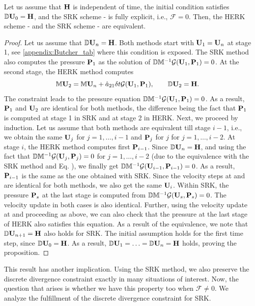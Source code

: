 \begin{proposition}\label{prop1}
Let us assume that $\H$ is independent of time, the initial condition satisfies $\D \U_0 = \H$, and the SRK scheme - is fully explicit, i.e., $\mathcal{F} = 0$. Then, the HERK scheme - and the SRK scheme  - are equivalent.
\end{proposition}
%
\begin{proof}
Let us assume that $\D \U_n = \H$. Both methods start with $\U_1 = \U_n$ at stage 1, see \ref{appendix:Butcher_tab} where this condition is exposed. The SRK method also computes the pressure $\P_1$ as the solution of $\D\M^{-1}\mathcal{G}(\U_1,\P_1) = 0$. At the second stage, the HERK method computes $$\M\U_2 = \M\U_n + \hat{a}_{21} \delta t \mathcal{G}(\U_1,\P_1), \qquad \D \U_2 = \H.$$ The constraint leads to the pressure equation $\D\M^{-1}\mathcal{G}(\U_1,\P_1) = 0$. As a result, $\P_1$ and $\U_2$ are identical for both methods, the difference being the fact that $\P_1$ is computed at stage 1 in SRK and at stage 2 in HERK. Next, we proceed by induction. Let us assume that both methods are equivalent till stage $i-1$, i.e., we obtain the same $\U_j$ for $j = 1, \ldots, i-1$ and $\P_j$ for $j$ for $j = 1, \ldots, i-2$. At stage $i$, the HERK method computes first $\P_{i-1}$. Since $\D \U_n = \H$, and using the fact that $ \D\M^{-1}\mathcal{G}(\U_j,\P_j) = 0$ for $j = 1, \ldots, i-2$ (due to the equivalence with the SRK method and Eq. ), we finally get $ \D\M^{-1}\mathcal{G}(\U_{i-1},\P_{i-1}) = 0$. As a result, $\P_{i-1}$ is the same as the one obtained with SRK. Since the velocity steps at  and  are identical for both methods, we also get the same $\U_i$. Within SRK, the pressure $\P_s$ at the last stage is computed from $\D\M^{-1} \mathcal{G}(\U_s,\P_s) = 0$. The velocity update in both cases is also identical. Further, using the velocity update at  and proceeding as above, we can also check that the pressure at the last stage of HERK also satisfies this equation. As a result of the equivalence, we note that $\D \U_{n+1} = \H$ also holds for SRK. The initial assumption holds for the first time step, since $\D \U_0 = \H$. As a result, $\D \U_1 = \ldots = \D \U_n = \H$ holds, proving the proposition.
\end{proof}

This result has another implication. Using the SRK method, we also preserve the discrete divergence constraint exactly in many situations of interest. Now, the question that arises is whether we have this property too when $\mathcal{F} \neq 0$. We analyze the fulfillment of the discrete divergence constraint for SRK.


